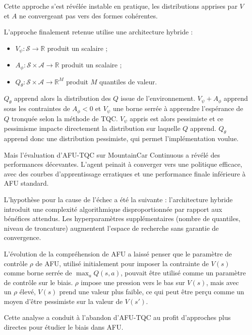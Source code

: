 \documentclass[a4paper, 12pt]{report}
\begin{document}
    Cette approche s'est révélée instable en pratique, les distributions
    apprises par $V$ et $A$ ne convergeant pas vers des formes cohérentes.

    L'approche finalement retenue utilise une architecture hybride :

    \begin{itemize}
      \item $V_\psi : \mathcal{S} \rightarrow \mathbb{R}$ produit un scalaire ;
      \item $A_\phi : \mathcal{S} \times \mathcal{A} \rightarrow \mathbb{R}$ produit un scalaire ;
      \item $Q_\theta : \mathcal{S} \times \mathcal{A} \rightarrow \mathbb{R}^M$ produit $M$ quantiles de valeur.
    \end{itemize}

    $Q_\theta$ apprend alors la distribution des $Q$ issue de l'environnement.
    $V_\psi + A_\phi$ apprend sous les contraintes de $A_\phi<0$ et $V_\psi$
    une borne serrée à apprendre l'espérance de $Q$ tronquée selon la méthode
    de TQC. $V_\psi$ appris est alors pessimiste et ce pessimisme impacte
    directement la distribution sur laquelle $Q$ apprend. $Q_\theta$ apprend
    donc une
    distribution pessimiste, qui permet l'implémentation voulue.

    Mais l'évaluation d'AFU-TQC sur MountainCar Continuous a révélé des
    performances décevantes. L'agent peinait à converger vers une politique
    efficace, avec des courbes d'apprentissage erratiques et une performance
    finale inférieure à AFU standard.

    L'hypothèse pour la cause de l'échec a été la suivante : l'architecture
    hybride introduit une complexité algorithmique disproportionnée par rapport
    aux bénéfices attendus. Les hyperparamètres supplémentaires (nombre de
    quantiles, niveau de troncature) augmentent l'espace de recherche sans
    garantie de convergence.

    L'évolution de la compréhension de AFU a laissé penser que le paramètre de
    contrôle $\rho$ de AFU, utilisé initialement pour imposer la contrainte de
    $V(s)$ comme borne serrée de $\max_a Q(s, a)$, pouvait être utilisé comme un
    paramètre de contrôle sur le biais. $\rho$ impose une pression vers le bas
    sur $V(s)$, mais avec un $\rho$ élevé, $V(s)$ prend une valeur plus faible,
    ce qui peut être perçu comme un moyen d'être pessimiste sur la valeur de
    $V(s')$.

    Cette analyse a conduit à l'abandon d'AFU-TQC au profit d'approches plus
    directes pour étudier le biais dans AFU.
\end{document}
